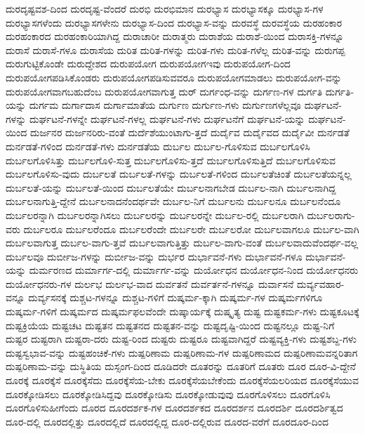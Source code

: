 {ದುರದೃಷ್ಟವಶ-ದಿಂದ
ದುರದೃಷ್ಟ-ವೆಂದರೆ
ದುರಭಿ
ದುರಭಿಮಾನ
ದುರಭ್ಯಾಸ
ದುರಭ್ಯಾಸಕ್ಕೂ
ದುರಭ್ಯಾಸ-ಗಳ
ದುರಭ್ಯಾಸಗಳೆಂದು
ದುರಭ್ಯಾಸಗಳೇನು
ದುರಭ್ಯಾಸ-ದಿಂದ
ದುರಭ್ಯಾಸ-ವನ್ನು
ದುರವಸ್ಥೆ
ದುರವಸ್ಥೆಯ
ದುರಹಂಕಾರ
ದುರಹಂಕಾರದ
ದುರಹಂಕಾರಿಯಾಗಿದ್ದ
ದುರಾಚಾರೀ
ದುರಾತ್ಮರು
ದುರಾಶೆಯ
ದುರಾಶೆ-ಯಿಂದ
ದುರಾಸಕ್ತಿ-ಗಳನ್ನೂ
ದುರಾಸೆ
ದುರಾಸೆ-ಗಳೂ
ದುರಾಸೆಯ
ದುರಿತ
ದುರಿತ-ಗಳನ್ನು
ದುರಿತ-ಗಳು
ದುರಿತ-ಗಳೆಲ್ಲ
ದುರಿತ-ವನ್ನು
ದುರುಗಪ್ಪ
ದುರುಗುಟ್ಟಿಕೊಂಡೇ
ದುರುದ್ದೇಶದ
ದುರುಪಯೋಗ
ದುರುಪಯೋಗಇವು
ದುರುಪಯೋಗ-ದಿಂದ
ದುರುಪಯೋಗಪಡಿಸಿಕೊಂಡರು
ದುರುಪಯೋಗಪಡಿಸುವವರೂ
ದುರುಪಯೋಗಮಾಡಲು
ದುರುಪಯೋಗ-ವನ್ನು
ದುರುಪಯೋಗವಾಗಬಹುದೆಂಬ
ದುರುಪಯೋಗವಾಗುತ್ತ
ದುರ್
ದುರ್ಗಂಧ-ವನ್ನು
ದುರ್ಗಣ-ಗಳ
ದುರ್ಗತಿ
ದುರ್ಗತಿ-ಯನ್ನು
ದುರ್ಗಮ
ದುರ್ಗಾದಾಸ
ದುರ್ಗಾಮಾತೆಯ
ದುರ್ಗುಣ
ದುರ್ಗುಣ-ಗಳು
ದುರ್ಗುಣಗಳೆಲ್ಲವೂ
ದುರ್ಘಟನೆ-ಗಳನ್ನು
ದುರ್ಘಟನೆ-ಗಳನ್ನೇ
ದುರ್ಘಟನೆ-ಗಳಲ್ಲ
ದುರ್ಘಟನೆ-ಗಳು
ದುರ್ಘಟನೆಗೆ
ದುರ್ಘಟನೆ-ಯನ್ನು
ದುರ್ಘಟನೆ-ಯಿಂದ
ದುರ್ಜನರ
ದುರ್ಜನರಿರು-ವಂತೆ
ದುರ್ದೆಶೆಯುಂಟಾಗು-ತ್ತದೆ
ದುರ್ದೈವ
ದುರ್ದೈವದ
ದುರ್ದೈವೀ
ದುರ್ನಡತೆ
ದುರ್ನಡತೆ-ಗಳಿಂದ
ದುರ್ನಡತೆ-ಗಳು
ದುರ್ನಡತೆಯ
ದುರ್ಬಲ
ದುರ್ಬಲ-ಗೊಳಿಸುವ
ದುರ್ಬಲಗೊಳಿಸಿ
ದುರ್ಬಲಗೊಳಿಸಿತ್ತು
ದುರ್ಬಲಗೊಳಿ-ಸುತ್ತ
ದುರ್ಬಲಗೊಳಿಸು-ತ್ತದೆ
ದುರ್ಬಲಗೊಳಿಸುತ್ತಿದೆ
ದುರ್ಬಲಗೊಳಿಸುವ
ದುರ್ಬಲಗೊಳಿಸು-ವುದು
ದುರ್ಬಲತೆ
ದುರ್ಬಲತೆ-ಗಳನ್ನು
ದುರ್ಬಲತೆ-ಗಳಿಂದ
ದುರ್ಬಲತೆಚಿಂತೆ
ದುರ್ಬಲತೆಯನ್ನಲ್ಲ
ದುರ್ಬಲತೆ-ಯನ್ನು
ದುರ್ಬಲತೆ-ಯಿಂದ
ದುರ್ಬಲತೆಯೇ
ದುರ್ಬಲನಾಗಬೇಡ
ದುರ್ಬಲ-ನಾಗಿ
ದುರ್ಬಲನಾಗಿದ್ದ
ದುರ್ಬಲನಾಗುತ್ತಿ-ದ್ದೇನೆ
ದುರ್ಬಲನಾದನೆಂದರ್ಥವೇ
ದುರ್ಬಲ-ನಿಗೆ
ದುರ್ಬಲನು
ದುರ್ಬಲನೂ
ದುರ್ಬಲನೆಂದೂ
ದುರ್ಬಲರನ್ನಾಗಿ
ದುರ್ಬಲರನ್ನಾಗಿಸಲು
ದುರ್ಬಲರನ್ನು
ದುರ್ಬಲರನ್ನೇ
ದುರ್ಬಲ-ರಲ್ಲಿ
ದುರ್ಬಲರಾಗಿ
ದುರ್ಬಲರಾಗು-ವರು
ದುರ್ಬಲರೂ
ದುರ್ಬಲರೆಂದೂ
ದುರ್ಬಲರೆಂದೇ
ದುರ್ಬಲರೇ
ದುರ್ಬಲರೋ
ದುರ್ಬಲವಾಗಲೂ
ದುರ್ಬಲ-ವಾಗಿ
ದುರ್ಬಲವಾಗುತ್ತ
ದುರ್ಬಲ-ವಾಗು-ತ್ತವೆ
ದುರ್ಬಲವಾಗುತ್ತಿತ್ತು
ದುರ್ಬಲ-ವಾಗು-ವಂತೆ
ದುರ್ಬಲವಾದುವೆಂದರ್ಥ-ವಲ್ಲ
ದುರ್ಬಲವೂ
ದುರ್ಬೀಜ-ಗಳನ್ನು
ದುರ್ಬೀಜ-ವನ್ನು
ದುರ್ಭರ
ದುರ್ಭಾವನೆ-ಗಳು
ದುರ್ಭಾವನೆ-ಗಳೂ
ದುರ್ಭಾವನೆ-ಯನ್ನು
ದುರ್ಮರಣದ
ದುರ್ಮಾರ್ಗ-ದಲ್ಲಿ
ದುರ್ಮಾರ್ಗ-ವನ್ನು
ದುರ್ಯೋಧನ
ದುರ್ಯೋಧನ-ನಿಂದ
ದುರ್ಯೋಧನರು
ದುರ್ಯೋಧನರು-ಗಳ
ದುರ್ಲಭ
ದುರ್ಲಭ-ವಾದ
ದುರ್ವತನೆ
ದುರ್ವರ್ತನೆ-ಗಳನ್ನೂ
ದುರ್ವಾಸನೆ
ದುರ್ವ್ಯವಹಾರ-ವನ್ನೂ
ದುರ್ವ್ಯಸನಕ್ಕೆ
ದುಶ್ಚಟ-ಗಳನ್ನೂ
ದುಶ್ಚಟ-ಗಳಿಗೆ
ದುಷ್ಕರ್ಮ-ಕ್ಕಾಗಿ
ದುಷ್ಕರ್ಮ-ಗಳ
ದುಷ್ಕರ್ಮಗಳಿಗೂ
ದುಷ್ಕರ್ಮ-ಗಳಿಗೆ
ದುಷ್ಕರ್ಮದ
ದುಷ್ಕರ್ಮಫಲವೆಂದೇ
ದುಷ್ಕಾರ್ಯಕ್ಕೆ
ದುಷ್ಕೃತ್ಯ
ದುಷ್ಟ
ದುಷ್ಟಕರ್ಮ-ಗಳು
ದುಷ್ಟಕೂಟಕ್ಕೆ
ದುಷ್ಟಕ್ರಿಯೆಯ
ದುಷ್ಟಚಟ
ದುಷ್ಟತನ
ದುಷ್ಟತನದ
ದುಷ್ಟತನ-ವನ್ನು
ದುಷ್ಟದೃಷ್ಟಿ-ಯಿಂದ
ದುಷ್ಟನಲ್ಲೂ
ದುಷ್ಟ-ನಿಗೆ
ದುಷ್ಟರ
ದುಷ್ಟರಾಗಿ
ದುಷ್ಟರಾ-ದರು
ದುಷ್ಟ-ರಿಂದ
ದುಷ್ಟರು
ದುಷ್ಟರೂ
ದುಷ್ಟವಾಗಿದ್ದರೆ
ದುಷ್ಟವ್ಯಕ್ತಿ-ಗಳು
ದುಷ್ಟಶಬ್ದ-ಗಳು
ದುಷ್ಟಸ್ವಭಾವ-ವನ್ನು
ದುಷ್ಟಹಂಚಿಕೆ-ಗಳು
ದುಷ್ಪರಿಣಾಮ
ದುಷ್ಪರಿಣಾಮ-ಗಳ
ದುಷ್ಪರಿಣಾಮದ
ದುಷ್ಪರಿಣಾಮವನ್ನರಿತಾಗ
ದುಷ್ಪರಿಣಾಮ-ವನ್ನು
ದುಸ್ಥಿತಿಯ
ದುಸ್ಸಂಗ-ದಿಂದ
ದೂಡಿದರೇ
ದೂತರನ್ನು
ದೂತರಿಗೆ
ದೂತರು
ದೂರ
ದೂರ-ವಿ-ದ್ದೇನೆ
ದೂರಕ್ಕೆ
ದೂರಕ್ಕೆಸೆ
ದೂರಕ್ಕೆಸೆದು
ದೂರಕ್ಕೆಸೆಯ-ಬೇಕು
ದೂರಕ್ಕೆಸೆಯಬೇಕೆಂದು
ದೂರಕ್ಕೆಸೆಯಲರಿಯದ
ದೂರಕ್ಕೆಸೆಯುವ
ದೂರಕ್ಕೋಡಿಸಲು
ದೂರಕ್ಕೋಡಿಸಿದ್ದವು
ದೂರಕ್ಕೋಡಿಸು
ದೂರಕ್ಕೋಡುವುವು
ದೂರಗೊಳಿಸಲು
ದೂರಗೊಳಿಸಿ
ದೂರಗೊಳಿಸುಹೀಗೆಂದು
ದೂರದ
ದೂರದರ್ಶಕ-ಗಳ
ದೂರದರ್ಶಕದ
ದೂರದರ್ಶನ
ದೂರದರ್ಶಿ
ದೂರದರ್ಶಿತ್ವದ
ದೂರ-ದಲ್ಲಿ
ದೂರದಲ್ಲಿತ್ತು
ದೂರದಲ್ಲಿದೆ
ದೂರದಲ್ಲಿದ್ದ
ದೂರ-ದಲ್ಲಿರುವ
ದೂರದ-ವರೆಗೆ
ದೂರದೂರ-ದಿಂದ
}
